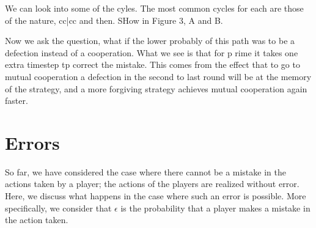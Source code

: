 \documentclass[11pt]{article}
\theoremstyle{plainCl1}
\theoremstyle{plainCl2}
\begin{document}
We can look into some of the cyles. The most common cycles for each are those
of the nature, cc|cc and then. SHow in Figure 3, A and B. 

Now we ask the question, what if the lower probably of this path was to be a defection
instead of a cooperation. What we see is that for p rime it takes one extra
timestep tp correct the mistake. This comes from the effect that to go to mutual
cooperation a defection in the second to last round will be at the memory of the
strategy, and a more forgiving strategy achieves mutual cooperation again faster. 







\newpage

\section{Errors}

So far, we have considered the case where there cannot be a mistake in the
actions taken by a player; the actions of the players are realized without
error. Here, we discuss what happens in the case where such an error is
possible. More specifically, we consider that \(\epsilon\) is the probability
that a player makes a mistake in the action taken.
\end{document}
